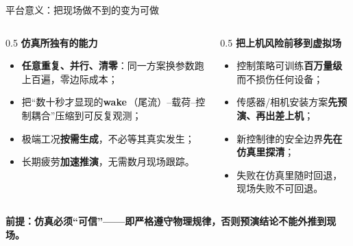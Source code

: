\documentclass[aspectratio=169,10pt,UTF8]{ctexbeamer}
\newcommand{\hl}[1]{{\color{myblue}\bfseries #1}}
\newcommand{\hlg}[1]{{\color{mygreen}\bfseries #1}}
\newcommand{\term}[2]{\textbf{#1}\,（#2）}
\begin{document}
\begin{frame}{平台意义：把现场做不到的变为可做}
  \begin{columns}[T]
    \begin{column}{0.5\textwidth}
      \textbf{仿真所独有的能力}
      \begin{itemize}\small
        \item \hlg{任意重复、并行、清零}：同一方案换参数跑上百遍，零边际成本；
        \item 把“数十秒才显现的\term{wake}{尾流}–载荷–控制耦合”压缩到可反复观测；
        \item 极端工况\textbf{按需生成}，不必等其真实发生；
        \item 长期疲劳\textbf{加速推演}，无需数月现场跟踪。
      \end{itemize}
    \end{column}
    \begin{column}{0.5\textwidth}
      \textbf{把上机风险前移到虚拟场}
      \begin{itemize}\small
        \item 控制策略可训练\textbf{百万量级}而不损伤任何设备；
        \item 传感器/相机安装方案\textbf{先预演、再出差上机}；
        \item 新控制律的安全边界\textbf{先在仿真里探清}；
        \item 失败在仿真里随时回退，现场失败不可回退。
      \end{itemize}
    \end{column}
  \end{columns}
  \vfill
  \begin{center}\small
    \hl{前提：仿真必须“可信”——即严格遵守物理规律，否则预演结论不能外推到现场。}
  \end{center}
\end{frame}
\end{document}
